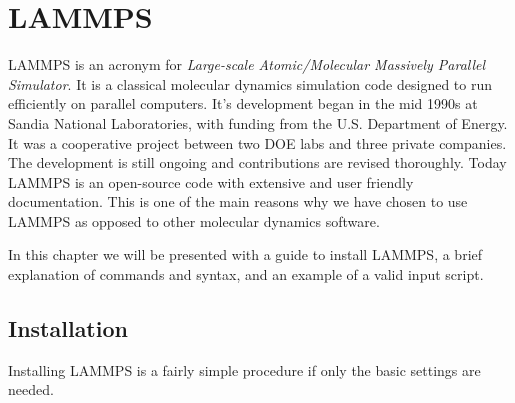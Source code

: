 \documentclass[twoside,english]{uiofysmaster}
\begin{document}
\chapter{LAMMPS}

LAMMPS is an acronym for \textit{Large-scale Atomic/Molecular Massively Parallel Simulator}. 
It is a classical molecular dynamics simulation code designed to run efficiently on parallel computers. 
It's development began in the mid 1990s at Sandia National Laboratories, with funding from the U.S. Department of Energy. 
It was a cooperative project between two DOE labs and three private companies. 
The development is still ongoing and contributions are revised thoroughly. 
Today LAMMPS is an open-source code with extensive and user friendly documentation. 
This is one of the main reasons why we have chosen to use LAMMPS as opposed to other molecular dynamics software. 

In this chapter we will be presented with a guide to install LAMMPS, a brief explanation of commands and syntax, and an example of a valid input script.
\section{Installation}
Installing LAMMPS is a fairly simple procedure if only the basic settings are needed.
\end{document}
